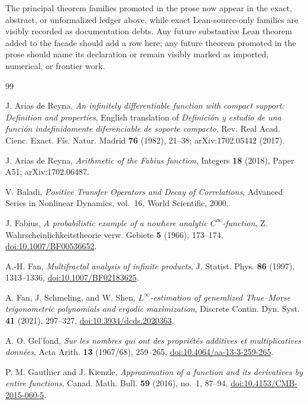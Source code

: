 \documentclass[11pt,oneside]{article}
\numberwithin{equation}{section}
\theoremstyle{definition}
\theoremstyle{remark}
\begin{document}
The principal theorem families promoted in the prose now appear in the exact, abstract, or
unformalized ledger above, while exact Lean-source-only families are visibly recorded as
documentation debts.  Any future substantive Lean theorem added to the facade should add a
row here; any future theorem promoted in the prose should name its declaration or remain
visibly marked as imported, numerical, or frontier work.

\begin{thebibliography}{99}
\small

J. Arias de Reyna,
\emph{An infinitely differentiable function with compact support: Definition and properties},
English translation of \emph{Definici\'on y estudio de una funci\'on indefinidamente
diferenciable de soporte compacto}, Rev. Real Acad. Cienc. Exact. F\'is. Natur. Madrid
\textbf{76} (1982), 21--38; arXiv:1702.05442 (2017).

J. Arias de Reyna,
\emph{Arithmetic of the Fabius function},
Integers \textbf{18} (2018), Paper A51; arXiv:1702.06487.

V. Baladi,
\emph{Positive Transfer Operators and Decay of Correlations},
Advanced Series in Nonlinear Dynamics, vol.~16, World Scientific, 2000.

J. Fabius,
\emph{A probabilistic example of a nowhere analytic $C^\infty$-function},
Z. Wahrscheinlichkeitstheorie verw. Gebiete \textbf{5} (1966), 173--174,
\href{https://doi.org/10.1007/BF00536652}{doi:10.1007/BF00536652}.

A.-H. Fan,
\emph{Multifractal analysis of infinite products},
J. Statist. Phys. \textbf{86} (1997), 1313--1336,
\href{https://doi.org/10.1007/BF02183625}{doi:10.1007/BF02183625}.

A. Fan, J. Schmeling, and W. Shen,
\emph{$L^\infty$-estimation of generalized Thue--Morse trigonometric polynomials and
ergodic maximization},
Discrete Contin. Dyn. Syst. \textbf{41} (2021), 297--327,
\href{https://doi.org/10.3934/dcds.2020363}{doi:10.3934/dcds.2020363}.

A. O. Gel'fond,
\emph{Sur les nombres qui ont des propri\'et\'es additives et multiplicatives donn\'ees},
Acta Arith. \textbf{13} (1967/68), 259--265,
\href{https://doi.org/10.4064/aa-13-3-259-265}{doi:10.4064/aa-13-3-259-265}.

P. M. Gauthier and J. Kienzle,
\emph{Approximation of a function and its derivatives by entire functions},
Canad. Math. Bull. \textbf{59} (2016), no.~1, 87--94,
\href{https://doi.org/10.4153/CMB-2015-060-5}{doi:10.4153/CMB-2015-060-5}.


\end{thebibliography}
\end{document}
